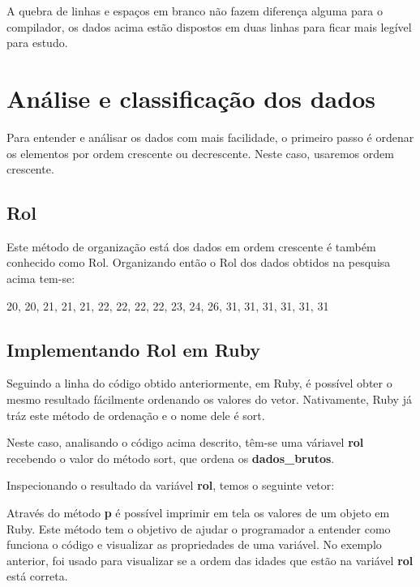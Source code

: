 \documentclass[espaco=simples,appendix=Name]{abnt}
\newcommand{\code}[1] {\textbf{#1}}
\begin{document}
A quebra de linhas e espaços em branco não fazem diferença alguma para o compilador, os dados acima estão dispostos em duas linhas para ficar mais legível para estudo.


\section { Análise e classificação dos dados }

Para entender e análisar os dados com mais facilidade, o primeiro passo é ordenar os elementos por ordem crescente ou decrescente. Neste caso, usaremos ordem crescente. 

\subsection { Rol }

Este método de organização está dos dados em ordem crescente é também conhecido como Rol. Organizando então o Rol dos dados obtidos na pesquisa acima tem-se:

20, 20, 21, 21, 21, 22, 22, 22, 22, 23, 24, 26, 31, 31, 31, 31, 31, 31

\subsection { Implementando Rol em Ruby }

Seguindo a linha do código obtido anteriormente, em Ruby, é possível obter o mesmo resultado fácilmente ordenando os valores do vetor. Nativamente, Ruby já tráz este método de ordenação e o nome dele é sort.

 

Neste caso, analisando o código acima descrito, têm-se uma váriavel \code{rol} recebendo o valor do método sort, que ordena os \code{dados\_brutos}.

Inspecionando o resultado da variável \code{rol}, temos o seguinte vetor:


 

Através do método \code{p} é possível imprimir em tela os valores de um objeto em Ruby. Este método tem o objetivo de ajudar o programador a entender como funciona o código e visualizar as propriedades de uma variável. No exemplo anterior, foi usado para visualizar se a ordem das idades que estão na variável \code{rol} está correta.
\end{document}
